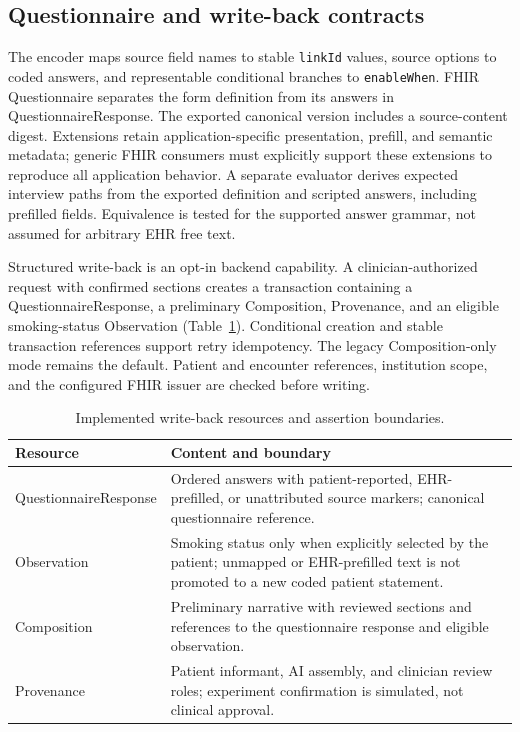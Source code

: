 \subsection{Questionnaire and write-back contracts}
The encoder maps source field names to stable \texttt{linkId} values, source
options to coded answers, and representable conditional branches to
\texttt{enableWhen}. FHIR Questionnaire separates the form definition from its
answers in QuestionnaireResponse.\cite{fhirQuestionnaireR4}
The exported canonical version includes a source-content digest. Extensions
retain application-specific presentation, prefill, and semantic metadata;
generic FHIR consumers must explicitly support these extensions to reproduce
all application behavior. A separate evaluator derives expected interview paths
from the exported definition and scripted answers, including prefilled fields.
Equivalence is tested for the supported answer grammar, not assumed for arbitrary
EHR free text.

Structured write-back is an opt-in backend capability. A clinician-authorized
request with confirmed sections creates a transaction containing a
QuestionnaireResponse, a preliminary Composition, Provenance, and an eligible
smoking-status Observation (Table~\ref{tab:fhir}). Conditional creation and stable
transaction references support retry idempotency. The legacy Composition-only
mode remains the default. Patient and encounter references, institution scope,
and the configured FHIR issuer are checked before writing.

\begin{table}[t]
\caption{Implemented write-back resources and assertion boundaries.}
\label{tab:fhir}\centering\small
\begin{tabular}{lp{8.1cm}}
\hline
Resource & Content and boundary \\
\hline
QuestionnaireResponse & Ordered answers with patient-reported, EHR-prefilled,
or unattributed source markers; canonical questionnaire reference. \\
Observation & Smoking status only when explicitly selected by the patient;
unmapped or EHR-prefilled text is not promoted to a new coded patient statement. \\
Composition & Preliminary narrative with reviewed sections and references to
the questionnaire response and eligible observation. \\
Provenance & Patient informant, AI assembly, and clinician review roles;
experiment confirmation is simulated, not clinical approval. \\
\hline
\end{tabular}
\end{table}

